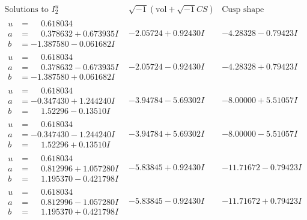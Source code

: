 \documentclass[1p]{elsarticle_modified}
\theoremstyle{definition}
\newcommand{\I}{\sqrt{-1}}
\begin{document}
$$\begin{array}{c|c|c}  
\text{Solutions to }I^u_{2}& \I (\text{vol} + \sqrt{-1}CS) & \text{Cusp shape}\\
 \hline 
\begin{aligned}
u &= \phantom{-}0.618034\phantom{ +0.000000I} \\
a &= \phantom{-}0.378632 + 0.673935 I \\
b &= -1.387580 - 0.061682 I\end{aligned}
 & -2.05724 + 0.92430 I & -4.28328 - 0.79423 I \\ \hline\begin{aligned}
u &= \phantom{-}0.618034\phantom{ +0.000000I} \\
a &= \phantom{-}0.378632 - 0.673935 I \\
b &= -1.387580 + 0.061682 I\end{aligned}
 & -2.05724 - 0.92430 I & -4.28328 + 0.79423 I \\ \hline\begin{aligned}
u &= \phantom{-}0.618034\phantom{ +0.000000I} \\
a &= -0.347430 + 1.244240 I \\
b &= \phantom{-}1.52296 - 0.13510 I\end{aligned}
 & -3.94784 - 5.69302 I & -8.00000 + 5.51057 I \\ \hline\begin{aligned}
u &= \phantom{-}0.618034\phantom{ +0.000000I} \\
a &= -0.347430 - 1.244240 I \\
b &= \phantom{-}1.52296 + 0.13510 I\end{aligned}
 & -3.94784 + 5.69302 I & -8.00000 - 5.51057 I \\ \hline\begin{aligned}
u &= \phantom{-}0.618034\phantom{ +0.000000I} \\
a &= \phantom{-}0.812996 + 1.057280 I \\
b &= \phantom{-}1.195370 - 0.421798 I\end{aligned}
 & -5.83845 + 0.92430 I & -11.71672 - 0.79423 I \\ \hline\begin{aligned}
u &= \phantom{-}0.618034\phantom{ +0.000000I} \\
a &= \phantom{-}0.812996 - 1.057280 I \\
b &= \phantom{-}1.195370 + 0.421798 I\end{aligned}
 & -5.83845 - 0.92430 I & -11.71672 + 0.79423 I \\ \hline\begin{aligned}

\end{aligned}
\end{array}$$
\end{document}
